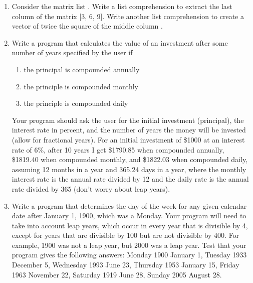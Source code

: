 \documentclass[letterpaper,10pt,english]{sphinxmanual}
\begin{document}
\begin{enumerate}
\begin{enumerate}
\end{enumerate}

\item {} 
Consider the matrix list .  Write a list comprehension to extract the last column of the matrix {[}3, 6, 9{]}.  Write another list comprehension to create a vector of twice the square of the middle column \code{{[}8, 50, 128{]}}.

\item {} 
Write a program that calculates the value of an investment after some number of years specified by the user if
\begin{enumerate}
\item {} 
the principal is compounded annually

\item {} 
the principle is compounded monthly

\item {} 
the principle is compounded daily

\end{enumerate}

Your program should ask the user for the initial investment (principal), the interest rate in percent, and the number of years the money will be invested (allow for fractional years).  For an initial investment of \$1000 at an interest rate of 6\%, after 10 years I get \$1790.85 when compounded annually, \$1819.40 when compounded monthly, and \$1822.03 when compounded daily, assuming 12 months in a year and 365.24 days in a year, where the monthly interest rate is the annual rate divided by 12 and the daily rate is the annual rate divided by 365 (don't worry about leap years).

\item {} 
Write a program that determines the day of the week for any given calendar date after January 1, 1900, which was a Monday.  Your program will need to take into account leap years, which occur in every year that is divisible by 4, except for years that are divisible by 100 but are not divisible by 400.  For example, 1900 was not a leap year, but 2000 was a leap year.  Test that your program gives the following answers: Monday 1900 January 1, Tuesday 1933 December 5, Wednesday 1993 June 23, Thursday 1953 January 15, Friday 1963 November 22, Saturday 1919 June 28, Sunday 2005 August 28.

\end{enumerate}
\end{document}
